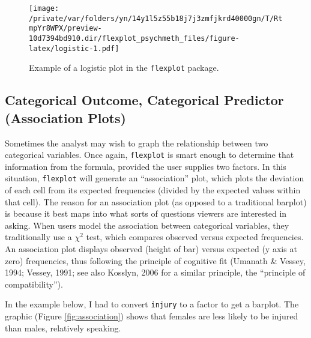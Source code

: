 \documentclass[
  english,
  man]{apa6}
\newenvironment{Shaded}{\begin{snugshade}}{\end{snugshade}}
\newcommand{\DataTypeTok}[1]{\textcolor[rgb]{0.13,0.29,0.53}{#1}}
\newcommand{\DecValTok}[1]{\textcolor[rgb]{0.00,0.00,0.81}{#1}}
\newcommand{\KeywordTok}[1]{\textcolor[rgb]{0.13,0.29,0.53}{\textbf{#1}}}
\newcommand{\NormalTok}[1]{#1}
\newcommand{\OperatorTok}[1]{\textcolor[rgb]{0.81,0.36,0.00}{\textbf{#1}}}
\newcommand{\StringTok}[1]{\textcolor[rgb]{0.31,0.60,0.02}{#1}}
\begin{document}
\begin{figure}
\centering
\texttt{[image: /private/var/folders/yn/14y1l5z55b18j7j3zmfjkrd40000gn/T/RtmpYr8WPX/preview-10d7394bd910.dir/flexplot\_psychmeth\_files/figure-latex/logistic-1.pdf]}
\caption{\label{fig:logistic}Example of a logistic plot in the \texttt{flexplot} package.\label{fig:logistic}}
\end{figure}

\normalsize

\hypertarget{categorical-outcome-categorical-predictor-association-plots}{%
\subsection{Categorical Outcome, Categorical Predictor (Association Plots)}\label{categorical-outcome-categorical-predictor-association-plots}}

Sometimes the analyst may wish to graph the relationship between two categorical variables. Once again, \texttt{flexplot} is smart enough to determine that information from the formula, provided the user supplies two factors. In this situation, \texttt{flexplot} will generate an ``association'' plot, which plots the deviation of each cell from its expected frequencies (divided by the expected values within that cell). The reason for an association plot (as opposed to a traditional barplot) is because it best maps into what sorts of questions viewers are interested in asking. When users model the association between categorical variables, they traditionally use a \(\chi^2\) test, which compares observed versus expected frequencies. An association plot displays observed (height of bar) versus expected (y axis at zero) frequencies, thus following the principle of cognitive fit (Umanath \& Vessey, 1994; Vessey, 1991; see also Kosslyn, 2006 for a similar principle, the ``principle of compatibility'').

In the example below, I had to convert \texttt{injury} to a factor to get a barplot. The graphic (Figure \ref{fig:association}) shows that females are less likely to be injured than males, relatively speaking.

\small

\begin{Shaded}
\end{Shaded}
\end{document}
